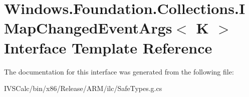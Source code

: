 \hypertarget{interface_windows_1_1_foundation_1_1_collections_1_1_i_map_changed_event_args}{}\section{Windows.\+Foundation.\+Collections.\+I\+Map\+Changed\+Event\+Args$<$ K $>$ Interface Template Reference}
\label{interface_windows_1_1_foundation_1_1_collections_1_1_i_map_changed_event_args}


The documentation for this interface was generated from the following file\+:\begin{DoxyCompactItemize}
\item 
I\+V\+S\+Calc/bin/x86/\+Release/\+A\+R\+M/ilc/Safe\+Types.\+g.\+cs\end{DoxyCompactItemize}
